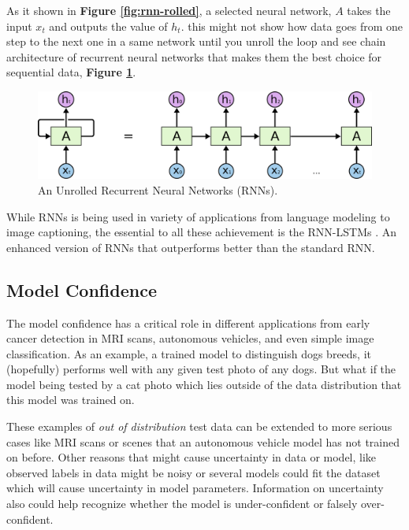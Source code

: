 As it shown in \textbf{Figure \ref{fig:rnn-rolled}}, a selected neural network, $A$ takes the input $x_t$ and outputs the value of $h_t$. this might not show how data goes from one step to the next one in a same network until you unroll the loop and see chain architecture of recurrent neural networks that makes them the best choice for sequential data, \textbf{Figure \ref{fig:rnn-unrolled}}.

\begin{figure}
	\centering
	\includegraphics[scale=0.4]{./figs/rnn-unrolled}
	\caption[An Unrolled Recurrent Neural Networks]{An Unrolled Recurrent Neural Networks (RNNs).}
	\label{fig:rnn-unrolled}
\end{figure}

While RNNs is being used in variety of applications from language modeling to image captioning, the essential to all these achievement is the RNN-LSTMs \cite{Hochreiter1997}. An enhanced version of RNNs that outperforms better than the standard RNN.

\subsection{Model Confidence}
The model confidence has a critical role in different applications from early cancer detection in MRI scans, autonomous vehicles, and even simple image classification.
As an example, a trained model to distinguish dogs breeds,
it (hopefully) performs well with any given test photo of any dogs. But what if the model being tested by a cat photo which lies outside of the data distribution that this model was trained on.

These examples of \textit{out of distribution} test data can be extended to more serious cases like MRI scans or scenes that an autonomous vehicle model has not trained on before.
Other reasons that might cause uncertainty in data or model, like observed labels in data might be noisy or several models could fit the dataset which will cause uncertainty in model parameters.
Information on uncertainty also could help recognize whether the model is under-confident or falsely over-confident.

